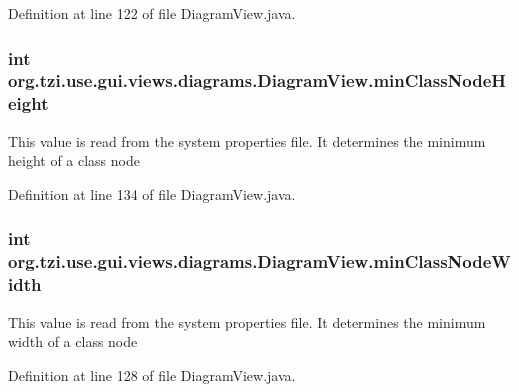 Definition at line 122 of file Diagram\-View.\-java.

\hypertarget{classorg_1_1tzi_1_1use_1_1gui_1_1views_1_1diagrams_1_1_diagram_view_a097fc30178c4702a33b80357df1977c4}{
\subsubsection[{min\-Class\-Node\-Height}]{\setlength{\rightskip}{0pt plus 5cm}int org.\-tzi.\-use.\-gui.\-views.\-diagrams.\-Diagram\-View.\-min\-Class\-Node\-Height\hspace{0.3cm}{\ttfamily [protected]}}}\label{classorg_1_1tzi_1_1use_1_1gui_1_1views_1_1diagrams_1_1_diagram_view_a097fc30178c4702a33b80357df1977c4}
This value is read from the system properties file. It determines the minimum height of a class node 

Definition at line 134 of file Diagram\-View.\-java.

\hypertarget{classorg_1_1tzi_1_1use_1_1gui_1_1views_1_1diagrams_1_1_diagram_view_afc597a1956b027609cc68353b8fc743d}{
\subsubsection[{min\-Class\-Node\-Width}]{\setlength{\rightskip}{0pt plus 5cm}int org.\-tzi.\-use.\-gui.\-views.\-diagrams.\-Diagram\-View.\-min\-Class\-Node\-Width\hspace{0.3cm}{\ttfamily [protected]}}}\label{classorg_1_1tzi_1_1use_1_1gui_1_1views_1_1diagrams_1_1_diagram_view_afc597a1956b027609cc68353b8fc743d}
This value is read from the system properties file. It determines the minimum width of a class node 

Definition at line 128 of file Diagram\-View.\-java.

